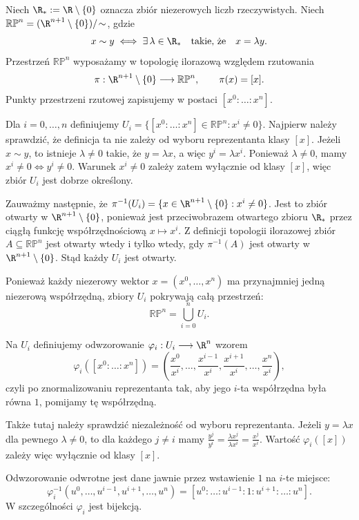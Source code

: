 \begin{przyklad}\label{prz:RPn}
Niech $\R_*:=\R\setminus\{0\}$ oznacza zbiór niezerowych
liczb rzeczywistych.
Niech $\mathbb{RP}^n = (\R^{n+1}\setminus\{0\})/\!\sim$,
gdzie
\[
x\sim y
\iff
\exists\,\lambda\in\R_*
\quad\text{takie, że}\quad
x=\lambda y.
\]
Przestrzeń $\mathbb{RP}^n$ wyposażamy w topologię ilorazową względem
rzutowania
\[
\pi:\R^{n+1}\setminus\{0\}\longrightarrow\mathbb{RP}^n,
\qquad
\pi(x)=[x].
\]
Punkty przestrzeni rzutowej zapisujemy w postaci $[x^0:\dots:x^n]$.

Dla $i=0,\dots,n$ definiujemy $U_i = \{[x^0:\dots:x^n]\in\mathbb{RP}^n:x^i\neq0\}$.
Najpierw należy sprawdzić, że definicja ta nie zależy od wyboru
reprezentanta klasy $[x]$. Jeżeli $x\sim y$, to istnieje
$\lambda\neq0$ takie, że $y=\lambda x$, a więc $y^i=\lambda x^i$.
Ponieważ $\lambda\neq0$, mamy $x^i\neq0 \iff y^i\neq0$.
Warunek $x^i\neq0$ zależy zatem wyłącznie od klasy $[x]$, więc zbiór
$U_i$ jest dobrze określony.

Zauważmy następnie, że $\pi^{-1}(U_i) = \{x\in\R^{n+1}\setminus\{0\}:x^i\neq0\}$.
Jest to zbiór otwarty w $\R^{n+1}\setminus\{0\}$, ponieważ jest
przeciwobrazem otwartego zbioru
$\R_*$ przez ciągłą funkcję współrzędnościową $x\longmapsto x^i$.
Z definicji topologii ilorazowej zbiór $A\subseteq\mathbb{RP}^n$
jest otwarty wtedy i tylko wtedy, gdy $\pi^{-1}(A)$ jest otwarty
w $\R^{n+1}\setminus\{0\}$. Stąd każdy $U_i$ jest otwarty.

Ponieważ każdy niezerowy wektor
$x=(x^0,\dots,x^n)$ ma przynajmniej jedną niezerową współrzędną,
zbiory $U_i$ pokrywają całą przestrzeń:
\[
\mathbb{RP}^n
=
\bigcup_{i=0}^n U_i.
\]

Na $U_i$ definiujemy odwzorowanie $\varphi_i:U_i\longrightarrow\R^n$
wzorem
\[
\varphi_i([x^0:\dots:x^n])
=
\left(
\frac{x^0}{x^i},
\dots,
\frac{x^{i-1}}{x^i},
\frac{x^{i+1}}{x^i},
\dots,
\frac{x^n}{x^i}
\right),
\]
czyli po znormalizowaniu reprezentanta tak, aby jego $i$-ta
współrzędna była równa $1$, pomijamy tę współrzędną.

Także tutaj należy sprawdzić niezależność od wyboru reprezentanta.
Jeżeli $y=\lambda x$ dla pewnego $\lambda\neq0$, to dla każdego
$j\neq i$ mamy $\frac{y^j}{y^i} = \frac{\lambda x^j}{\lambda x^i} = \frac{x^j}{x^i}$.
Wartość $\varphi_i([x])$ zależy więc wyłącznie od klasy $[x]$.

Odwzorowanie odwrotne jest dane jawnie przez wstawienie $1$
na $i$-te miejsce:
\[
\varphi_i^{-1}
(u^0,\dots,u^{i-1},u^{i+1},\dots,u^n)
=
[u^0:\dots:u^{i-1}:1:u^{i+1}:\dots:u^n].
\]
W szczególności $\varphi_i$ jest bijekcją.


\end{przyklad}
